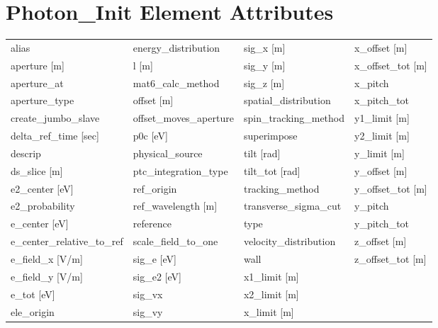  \section{Photon_Init Element Attributes}
 \label{s:list.photon.init}
 
 \begin{tabular}{llll} \toprule
alias                            & energy_distribution              & sig_x [m]                        & x_offset [m]                     \\
aperture [m]                     & l [m]                            & sig_y [m]                        & x_offset_tot [m]                 \\
aperture_at                      & mat6_calc_method                 & sig_z [m]                        & x_pitch                          \\
aperture_type                    & offset [m]                       & spatial_distribution             & x_pitch_tot                      \\
create_jumbo_slave               & offset_moves_aperture            & spin_tracking_method             & y1_limit [m]                     \\
delta_ref_time [sec]             & p0c [eV]                         & superimpose                      & y2_limit [m]                     \\
descrip                          & physical_source                  & tilt [rad]                       & y_limit [m]                      \\
ds_slice [m]                     & ptc_integration_type             & tilt_tot [rad]                   & y_offset [m]                     \\
e2_center [eV]                   & ref_origin                       & tracking_method                  & y_offset_tot [m]                 \\
e2_probability                   & ref_wavelength [m]               & transverse_sigma_cut             & y_pitch                          \\
e_center [eV]                    & reference                        & type                             & y_pitch_tot                      \\
e_center_relative_to_ref         & scale_field_to_one               & velocity_distribution            & z_offset [m]                     \\
e_field_x [V/m]                  & sig_e [eV]                       & wall                             & z_offset_tot [m]                 \\
e_field_y [V/m]                  & sig_e2 [eV]                      & x1_limit [m]                     &                                  \\
e_tot [eV]                       & sig_vx                           & x2_limit [m]                     &                                  \\
ele_origin                       & sig_vy                           & x_limit [m]                      &                                  \\
 \bottomrule
 \end{tabular}
 \vfill
 
